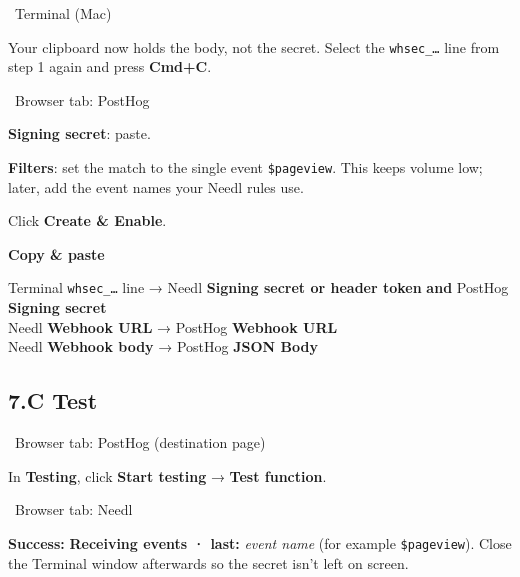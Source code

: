 \documentclass[11pt,a4paper]{article}
\newcommand{\ui}[1]{\textbf{#1}}
\newcommand{\where}[1]{\par\smallskip\noindent\colorbox{winbg}{\color{winfg}\bfseries\strut\ #1\ }\par\nopagebreak[4]}
\newcommand{\lit}[1]{\texttt{#1}}
\newenvironment{xfer}{\def\FrameCommand{\fboxsep=6pt\colorbox{xferbg}}\MakeFramed{\advance\hsize-\width\FrameRestore}\textbf{Copy \& paste}\par}{\endMakeFramed}
\begin{document}
\where{Terminal (Mac)}
\begin{steps}[resume]
\item Your clipboard now holds the body, not the secret. Select the \lit{whsec\_…} line from step 1 again and press \ui{Cmd+C}.
\end{steps}
\where{Browser tab: PostHog}
\begin{steps}[resume]
\item \ui{Signing secret}: paste.
\item \ui{Filters}: set the match to the single event \lit{\$pageview}. This keeps volume low; later, add the event names your Needl rules use.
\item Click \ui{Create \& Enable}.
\end{steps}
\begin{xfer}
Terminal \lit{whsec\_…} line → Needl \ui{Signing secret or header token} \textbf{and} PostHog \ui{Signing secret}\\
Needl \ui{Webhook URL} → PostHog \ui{Webhook URL}\\
Needl \ui{Webhook body} → PostHog \ui{JSON Body}
\end{xfer}

\subsection*{7.C Test}
\where{Browser tab: PostHog (destination page)}
In \ui{Testing}, click \ui{Start testing} → \ui{Test function}.
\where{Browser tab: Needl}
\textbf{Success:} \ui{Receiving events · last: }\textit{event name} (for example \lit{\$pageview}). Close the Terminal window afterwards so the secret isn't left on screen.
\end{document}
